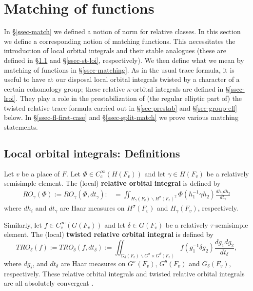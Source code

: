 \documentclass[12pt]{amsart}
\theoremstyle{remark}
\numberwithin{equation}{section}
\theoremstyle{definition}
\numberwithin{equation}{subsection}
\begin{document}
\section{Matching of functions} \label{sec-matching}

In \S \ref{ssec-match} we defined a notion of norm for relative classes.  In this section we define
a corresponding notion of matching functions.  This necessitates the introduction
of local orbital integrals and their stable analogues (these are defined in \S \ref{ssec-loi} and \S \ref{ssec-st-loi}, respectively).
We then define what we mean by matching of functions in \S \ref{ssec-matching}.  As in the usual trace formula, it is useful to
have at our disposal local orbital integrals twisted by a character of a certain cohomology group; these relative $\kappa$-orbital integrals
are defined in \S \ref{ssec-lroi}.  They play a role in the prestabilization of (the regular elliptic part of) the twisted relative trace formula
carried out in \S \ref{sec-prestab} and \S \ref{sec-group-ell} below.  In \S \ref{ssec-fl-first-case} and \S \ref{ssec-split-match} we prove various matching statements.

\subsection{Local orbital integrals: Definitions} \label{ssec-loi}
Let $v$ be a place of $F$.  Let
$\Phi \in C^{\infty}_c(
H(F_{v}))$ and let $\gamma \in H(F_v)$ be a relatively semisimple element.   The (local) {\bf relative
orbital integral} is defined by
\begin{align}\label{loi}
RO_{\gamma}(\Phi):=RO_{\gamma}(\Phi,dt_{\gamma}):&=\iint_{H_{\gamma}(F_v) \backslash
H^{\sigma}(F_{v})^2}\Phi(h_1^{-1} \gamma h_2)
\frac{dh_1dh_2}{dt_{\gamma}}
\end{align}where $dh_i$ and $dt_{\gamma}$ are Haar measures on $H^{\sigma}(F_v)$ and $H_{\gamma}(F_v)$, respectively.

Similarly, let $f \in C^{\infty}_c(G(F_v))$ and let $\delta \in G(F_v)$ be a
relatively $\tau$-semisimple element.  The (local) {\bf twisted relative orbital integral} is defined by
$$
TRO_{\delta}(f):=TRO_{\delta}(f,dt_{\delta}):=
\iint_{G_{\delta}( F_v) \backslash G^{\sigma} \times G^{\theta}(F_v)}
f(g_1^{-1} \delta g_2)  \frac{dg_1dg_2}{dt_{\delta}},
$$ where $dg_i$, and $dt_{\delta}$ are Haar measures on $G^{\sigma}( F_v)$, $G^{\theta}(F_v)$ and $G_{\delta}(F_v)$, respectively.
These relative orbital integrals and twisted relative orbital integrals are all absolutely convergent \cite{Hahn}.
\end{document}

